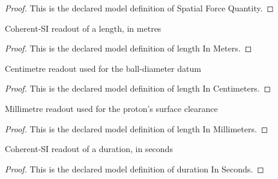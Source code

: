 \begin{proof}
  This is the declared model definition of Spatial Force Quantity.
\end{proof}
\begin{definition}
  \label{def:physics:phyx-mini-0912:phyxminiproblems-problemphyxmini0912-lengthinmeters}
  Coherent-SI readout of a length, in metres
\end{definition}
\begin{proof}
  This is the declared model definition of length In Meters.
\end{proof}
\begin{definition}
  \label{def:physics:phyx-mini-0912:phyxminiproblems-problemphyxmini0912-lengthincentimeters}
  Centimetre readout used for the ball-diameter datum
\end{definition}
\begin{proof}
  This is the declared model definition of length In Centimeters.
\end{proof}
\begin{definition}
  \label{def:physics:phyx-mini-0912:phyxminiproblems-problemphyxmini0912-lengthinmillimeters}
  Millimetre readout used for the proton's surface clearance
\end{definition}
\begin{proof}
  This is the declared model definition of length In Millimeters.
\end{proof}
\begin{definition}
  \label{def:physics:phyx-mini-0912:phyxminiproblems-problemphyxmini0912-durationinseconds}
  Coherent-SI readout of a duration, in seconds
\end{definition}
\begin{proof}
  This is the declared model definition of duration In Seconds.
\end{proof}
